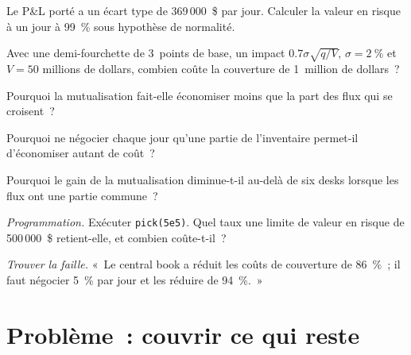 \begin{exercise}[$\star$]\label{exo:s2:the-central-risk-book:2}
Le P\&L porté a un écart type de 369\,000~\$ par jour. Calculer la valeur en risque à un jour à 99~\% sous hypothèse de normalité.
\end{exercise}

\begin{exercise}[$\star$]\label{exo:s2:the-central-risk-book:3}
Avec une demi-fourchette de 3~points de base, un impact $0.7\sigma\sqrt{q/V}$, $\sigma = 2~\%$ et $V = 50$ millions de dollars, combien coûte la couverture de 1~million de dollars~?
\end{exercise}

\begin{exercise}[$\star\star$]\label{exo:s2:the-central-risk-book:4}
Pourquoi la mutualisation fait-elle économiser moins que la part des flux qui se croisent~?
\end{exercise}

\begin{exercise}[$\star\star$]\label{exo:s2:the-central-risk-book:5}
Pourquoi ne négocier chaque jour qu'une partie de l'inventaire permet-il d'économiser autant de coût~?
\end{exercise}

\begin{exercise}[$\star\star$]\label{exo:s2:the-central-risk-book:6}
Pourquoi le gain de la mutualisation diminue-t-il au-delà de six desks lorsque les flux ont une partie commune~?
\end{exercise}

\begin{exercise}[$\star\star\star$]\label{exo:s2:the-central-risk-book:7}
\emph{Programmation.} Exécuter \texttt{pick(5e5)}. Quel taux une limite de valeur en risque de 500\,000~\$ retient-elle, et combien coûte-t-il~?
\end{exercise}

\begin{exercise}[$\star\star\star$]\label{exo:s2:the-central-risk-book:8}
\emph{Trouver la faille.} «~Le central book a réduit les coûts de couverture de 86~\%~; il faut négocier 5~\% par jour et les réduire de 94~\%.~»
\end{exercise}

\section{Problème~: couvrir ce qui reste}

